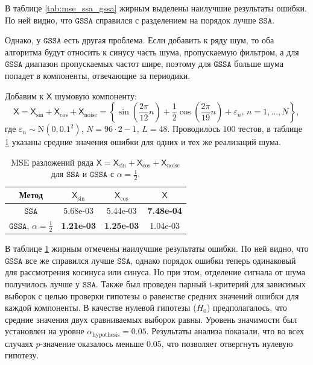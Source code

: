 \documentclass[12pt, specialist, subf
]{disser}
\theoremstyle{definition}
\newcommand{\SSA}{\texttt{SSA}}
\newcommand{\GSSA}{\texttt{GSSA}}
\newcommand{\TS}{\mathsf{X}}
\begin{document}
В таблице \ref{tab:mse_ssa_gssa} жирным выделены наилучшие результаты ошибки. По ней видно, что $\GSSA$ справился с разделением на порядок лучше $\SSA$.

Однако, у $\GSSA$ есть другая проблема. Если добавить к ряду шум, то оба алгоритма будут относить к синусу часть шума, пропускаемую фильтром, а для $\GSSA$ диапазон пропускаемых частот шире, поэтому для $\GSSA$ больше шума попадет в компоненты, отвечающие за периодики.

Добавим к $\TS$ шумовую компоненту: \[\TS = \TS_{\sin} + \TS_{\cos} + \TS_{\mathrm{noise}} =
	\left\{
	\sin\left(\frac{2\pi}{12}n\right) +
	\frac{1}{2}\cos\left(\frac{2\pi}{19}n\right)+
	\varepsilon_n, \,
	n = 1, \dots, N
	\right\}, \]
где $\varepsilon_n \sim \mathrm N(0, 0.1^2)$, $N = 96 \cdot 2 - 1$, $L = 48$.
Проводилось $100$ тестов, в таблице \ref{tab:errs_ssa_gssa} указаны средние значения ошибки для одних и тех же реализаций шума.


\begin{table}[H]
	\caption{MSE разложений ряда $\TS = \TS_{\sin} + \TS_{\cos} + \TS_{\mathrm{noise}}$ для $\SSA$ и $\GSSA$ с $\alpha = \frac{1}{2}$.}
	\label{tab:errs_ssa_gssa}
	\centering
	\begin{tabular}{c|ccc}
		\hline
		Метод                                 & $\TS_{\sin}$      & $\TS_{\cos}$      & $\TS$             \\
		\hline
		$\SSA$                         & 5.68e-03          & 5.44e-03          & \textbf{7.48e-04} \\
		$\GSSA$, $\alpha = \frac{1}{2}$ & \textbf{1.21e-03} & \textbf{1.25e-03} & 1.04e-03          \\
		\hline
	\end{tabular}

\end{table}

В таблице \ref{tab:errs_ssa_gssa} жирным отмечены наилучшие результаты ошибки. По ней видно, что $\GSSA$ все же справился лучше $\SSA$, однако порядок ошибки теперь одинаковый для рассмотрения косинуса или синуса. Но при этом, отделение сигнала от шума получилось лучше у $\SSA$.
Также был проведен парный t-критерий для зависимых выборок с целью проверки гипотезы о равенстве средних значений ошибки для каждой компоненты. В качестве нулевой гипотезы ($H_0$) предполагалось, что средние значения двух сравниваемых выборок равны. Уровень значимости был установлен на уровне $\alpha_{\mathrm{hypothesis}} = 0.05$.
Результаты анализа показали, что во всех случаях $p$-значение оказалось меньше 0.05, что позволяет отвергнуть нулевую гипотезу.
\end{document}
